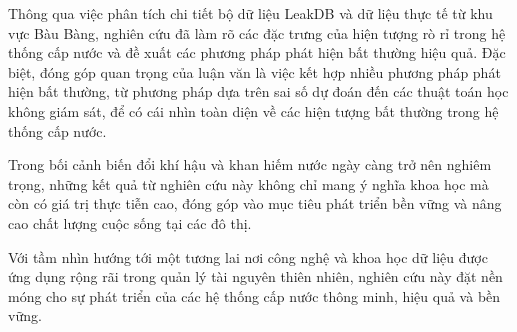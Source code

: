 Thông qua việc phân tích chi tiết bộ dữ liệu LeakDB và dữ liệu thực tế từ khu vực Bàu Bàng, nghiên cứu đã làm rõ các đặc trưng của hiện tượng rò rỉ trong hệ thống cấp nước và đề xuất các phương pháp phát hiện bất thường hiệu quả. Đặc biệt, đóng góp quan trọng của luận văn là việc kết hợp nhiều phương pháp phát hiện bất thường, từ phương pháp dựa trên sai số dự đoán đến các thuật toán học không giám sát, để có cái nhìn toàn diện về các hiện tượng bất thường trong hệ thống cấp nước.

Trong bối cảnh biến đổi khí hậu và khan hiếm nước ngày càng trở nên nghiêm trọng, những kết quả từ nghiên cứu này không chỉ mang ý nghĩa khoa học mà còn có giá trị thực tiễn cao, đóng góp vào mục tiêu phát triển bền vững và nâng cao chất lượng cuộc sống tại các đô thị.

Với tầm nhìn hướng tới một tương lai nơi công nghệ và khoa học dữ liệu được ứng dụng rộng rãi trong quản lý tài nguyên thiên nhiên, nghiên cứu này đặt nền móng cho sự phát triển của các hệ thống cấp nước thông minh, hiệu quả và bền vững.
